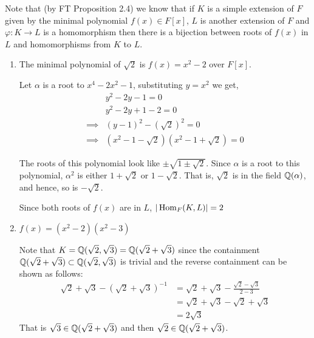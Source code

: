 \documentclass[12pt]{article}
\begin{document}
\begin{solution}

    \bbni

    Note that (by FT Proposition 2.4) we know that if $K$ is a simple extension of $F$ given by the minimal polynomial $f(x) \in F[x]$,  $L$ is another extension of $F$ and $\varphi: K \to L$ is a homomorphism then there is a bijection between roots of $f(x)$ in $L$ and homomorphisms from $K$ to $L$. 

    \begin{enumerate}
        \item The minimal polynomial of $\sqrt{2}$ is $f(x) = x^2 - 2$ over $F[x]$. 
        
        Let $\alpha$ is a root to $x^4 - 2x^2 -1$, substituting $y = x^2$ we get, 
        \begin{align*}
            &y^2 - 2y -1 = 0 \\
            &y^2 - 2y +1 - 2 = 0 \\
            \implies &(y-1)^2  - (\sqrt{2})^2= 0 \\
            \implies &(x^2-1 - \sqrt{2})(x^2-1 + \sqrt{2}) = 0
        \end{align*}
         
        The roots of this polynomial look like $\pm\sqrt{1 \pm \sqrt{2}}$. Since $\alpha$ is a root to this polynomial, $\alpha^2$ is either $1 + \sqrt{2}$ or $1 - \sqrt{2}$. That is, $\sqrt{2}$ is in the field $\mathbb Q(\alpha)$, and hence, so is $-\sqrt{2}$. 

        Since both roots of $f(x)$ are in $L$, $|\operatorname{Hom}_F(K,L)| =2$

        \item $f(x) = (x^2-2)(x^2 - 3)$ 
        
        Note that $K = \mathbb Q(\sqrt{2}, \sqrt{3}) = \mathbb Q(\sqrt{2}+ \sqrt{3})$ since the containment $\mathbb Q(\sqrt{2} + \sqrt{3}) \subset \mathbb Q(\sqrt{2}, \sqrt{3})$ is trivial and the reverse containment can be shown as follows: 
        \begin{align*}
            \sqrt{2} + \sqrt{3} -(\sqrt{2} + \sqrt{3})^{-1} &= \sqrt{2} + \sqrt{3} - \frac{\sqrt{2} - \sqrt{3}}{2-3} \\ 
            &= \sqrt{2} + \sqrt{3} - {\sqrt{2} + \sqrt{3}} \\ 
            &= 2\sqrt{3}
        \end{align*}
        That is $\sqrt{3} \in \mathbb Q(\sqrt{2} + \sqrt{3})$ and then $\sqrt{2} \in \mathbb Q(\sqrt{2} + \sqrt{3})$. 
        

\end{enumerate}
\end{solution}
\end{document}
